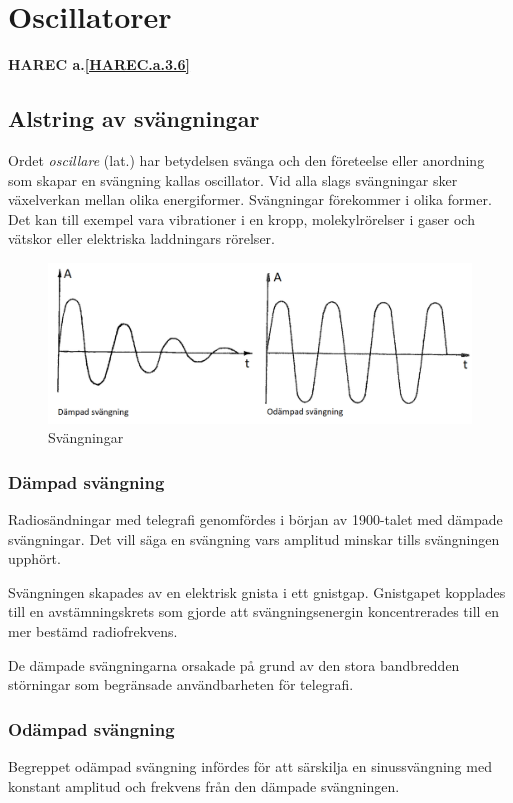 \section{Oscillatorer}
\textbf{HAREC a.\ref{HAREC.a.3.6}\label{myHAREC.a.3.6}}
\label{oscillatorer}

\subsection{Alstring av svängningar}
Ordet \emph{oscillare} (lat.) har betydelsen svänga och den företeelse
eller anordning som skapar en svängning kallas oscillator.
Vid alla slags svängningar sker växelverkan mellan olika energiformer.
Svängningar förekommer i olika former.
Det kan till exempel vara vibrationer i en kropp, molekylrörelser i gaser och
vätskor eller elektriska laddningars rörelser.

\begin{figure}
\includegraphics[width=\textwidth]{images/cropped_pdfs/bild_2_3-63.pdf}
\caption{Svängningar}
\label{fig:BildII3-63}
\end{figure}

\subsubsection{Dämpad svängning}
Radiosändningar med telegrafi genomfördes i början av 1900-talet med dämpade
svängningar.
Det vill säga en svängning vars amplitud minskar tills svängningen upphört.

Svängningen skapades av en elektrisk gnista i ett gnistgap.
Gnistgapet kopplades till en avstämningskrets som gjorde att svängningsenergin
koncentrerades till en mer bestämd radiofrekvens.

De dämpade svängningarna orsakade på grund av den stora bandbredden störningar
som begränsade användbarheten för telegrafi.

\subsubsection{Odämpad svängning}
Begreppet odämpad svängning infördes för att särskilja en sinussvängning med konstant amplitud och 
frekvens från den dämpade svängningen.


